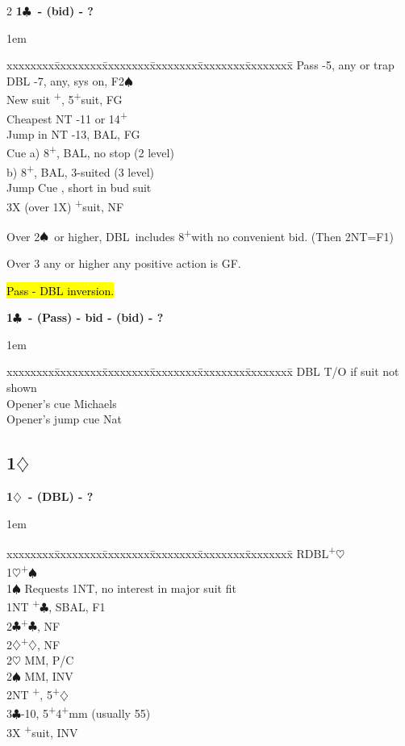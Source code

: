 \documentclass[10pt]{article}
\renewcommand{\c}{$\clubsuit$}
\renewcommand{\d}{$\diamondsuit$}
\newcommand{\h}{$\heartsuit$}
\newcommand{\s}{$\spadesuit$}
\newcommand{\p}{\textsuperscript{+}}
\newcommand{\x}{DBL}
\newcommand{\xx}{RDBL}
\newenvironment{bidtable}[1][]
{\textbf{#1}
  \begin{adjustwidth}{1em}{}
    \addvspace{2pt}
    \begin{tabbing}
      xxxxxxxx\=xxxxxxxx\=xxxxxxxx\=xxxxxxxx\=xxxxxxxx\=xxxxxxxx\=\kill}
{\end{tabbing}\end{adjustwidth}\bigskip}%
\newcommand{\pdfd}{\texorpdfstring{\d{}}{D}}
\begin{document}
\begin{multicols*}{2}
\begin{bidtable}[1\c\ - (bid) - ?]
Pass         \>  -5, any or trap                \\
\x           \>  -7, any, sys on, F2\s                \\
New suit     \>  \p, 5\p suit, FG               \\
Cheapest NT  \>  -11 or 14\p                    \\
Jump in NT   \>  -13, BAL, FG                  \\
Cue          \>  \> a) 8\p, BAL, no stop (2 level)  \\
             \>  \> b) 8\p, BAL, 3-suited (3 level) \\
Jump Cue     \>  , short in bud suit         \\
3X (over 1X) \>  \p suit, NF
\end{bidtable}

Over 2\s\ or higher, \x\ includes 8\p with no convenient bid. (Then 2NT=F1)

Over 3 any or higher any positive action is GF.

\hl{Pass - DBL inversion.}

\begin{bidtable}[1\c\ - (Pass) - bid - (bid) - ?]
\x                \>  \> T/O if suit not shown \\
Opener's cue      \>  \> Michaels              \\
Opener's jump cue \>  \> Nat
\end{bidtable}

\subsection{1\pdfd}

\begin{bidtable}[1\d\ - (\x) - ?]
\xx  {}\p\h                                       \\
1\h {}\p\s                                       \\
1\s \> Requests 1NT, no interest in major suit fit \\
1NT \p\c, SBAL, F1                             \\
2\c {}\p\c, NF                                   \\
2\d {}\p\d, NF                                   \\
2\h {} MM, P/C                                  \\
2\s {} MM, INV                                  \\
2NT \p, 5\p\d                                 \\
3\c {}-10, 5\p4\p mm (usually 55)                \\
3X  \p suit, INV                               \\
\end{bidtable}


\end{multicols*}
\end{document}
